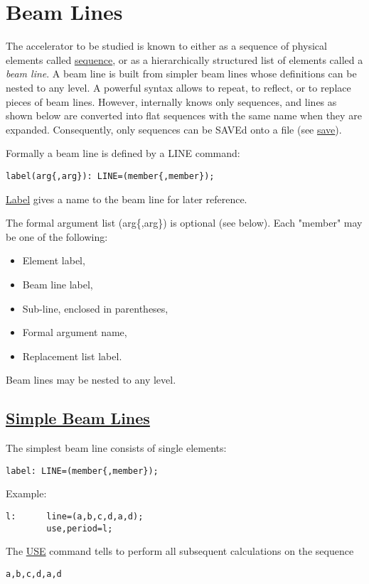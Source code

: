

\chapter{Beam Lines}
\label{chap:lines}

The accelerator to be studied is known to \madx either as a sequence of
physical elements called \href{sequence.html}{sequence}, or as a
hierarchically structured list of elements called a \emph{beam line}. A
beam line is built from simpler beam lines whose definitions can be
nested to any level. A powerful syntax allows to repeat, to reflect, or
to replace pieces of beam lines. However, internally \madx knows only
sequences, and lines as shown below are converted into flat sequences
with the same name when they are expanded. Consequently, only sequences
can be SAVEd onto a file (see
\href{../control/general.html#save}{save}).  

Formally a beam line is defined by a LINE command: 
\begin{verbatim}
label(arg{,arg}): LINE=(member{,member});
\end{verbatim}
\href{label.html}{Label} gives a name to the beam line for later reference. 

The formal argument list (arg\{,arg\}) is optional (see below). Each
"member" may be one of the following:  
\begin{itemize}
	\item  Element label, 
	\item  Beam line label, 
	\item  Sub-line, enclosed in parentheses, 
	\item  Formal argument name, 
	\item  Replacement list label. 
\end{itemize} 
Beam lines may be nested to any level.  

\section{\href{simple}{Simple Beam Lines}} 
The simplest beam line consists of single elements: 
\begin{verbatim}
label: LINE=(member{,member});
\end{verbatim} 
Example: 
\begin{verbatim}
l:      line=(a,b,c,d,a,d);
        use,period=l;
\end{verbatim} 
The \href{../control/general.html#use}{USE} command tells \madx to perform
all subsequent calculations on the sequence  
\begin{verbatim}
a,b,c,d,a,d
\end{verbatim}

